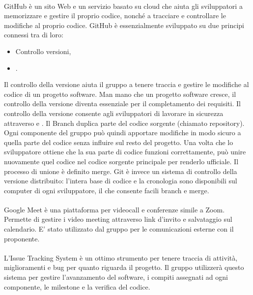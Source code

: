 \paragraph{}
GitHub è un sito Web e un servizio basato su cloud che aiuta gli sviluppatori a memorizzare e gestire il proprio codice, nonché a tracciare e controllare le modifiche al proprio codice. GitHub è essenzialmente sviluppato su due principi connessi tra di loro:
\begin{itemize}
    \item Controllo versioni,
    \item {}.
\end{itemize}
Il controllo della versione aiuta il gruppo a tenere traccia e gestire le modifiche al codice di un progetto software. Man mano che un progetto software cresce, il controllo della versione diventa essenziale per il completamento dei requisiti. Il controllo della versione consente agli sviluppatori di lavorare in sicurezza attraverso  e . Il Branch duplica parte del codice sorgente (chiamato repository). Ogni componente del gruppo può quindi apportare modifiche in modo sicuro a quella parte del codice senza influire sul resto del progetto. Una volta che lo sviluppatore ottiene che la sua parte di codice funzioni correttamente, può unire nuovamente quel codice nel codice sorgente principale per renderlo ufficiale. Il processo di unione è definito merge.
Git è invece un sistema di controllo della versione distribuito: l'intera base di codice e la cronologia sono disponibili sul computer di ogni sviluppatore, il che consente facili branch e merge.

\paragraph{}
Google Meet è una piattaforma per videocall e conferenze simile a Zoom. Permette di gestire i video meeting attraverso link d'invito e salvataggio sul calendario. E' stato utilizzato dal gruppo per le comunicazioni esterne con il proponente.

\paragraph{}
L'Issue Tracking System è un ottimo strumento per tenere traccia di attività, miglioramenti e bug per quanto riguarda il progetto. Il gruppo utilizzerà questo sistema per gestire l'avanzamento del software, i compiti assegnati ad ogni componente, le milestone e la verifica del codice.

